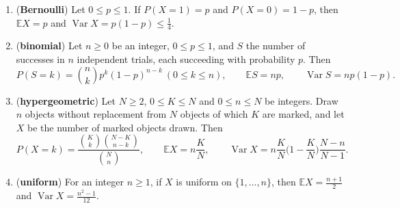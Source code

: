 \begin{proposition}\label{prop:laws}
\begin{enumerate}[label=(\alph*)]
\item (\textbf{Bernoulli}) Let $0\le p\le1$. If $P(X=1)=p$ and $P(X=0)=1-p$, then $\mathbb E X=p$ and $\operatorname{Var}X=p(1-p)\le\frac14$.
\item (\textbf{binomial}) Let $n\ge0$ be an integer, $0\le p\le1$, and $S$ the number of successes in $n$ independent trials, each succeeding with probability $p$. Then
\[
P(S=k)=\binom nkp^k(1-p)^{n-k}\ (0\le k\le n),\qquad\mathbb E S=np,\qquad\operatorname{Var}S=np(1-p).
\]
\item (\textbf{hypergeometric}) Let $N\ge2$, $0\le K\le N$ and $0\le n\le N$ be integers. Draw $n$ objects without replacement from $N$ objects of which $K$ are marked, and let $X$ be the number of marked objects drawn. Then
\[
P(X=k)=\frac{\binom Kk\binom{N-K}{n-k}}{\binom Nn},\qquad\mathbb E X=n\frac KN,\qquad\operatorname{Var}X=n\frac KN\Big(1-\frac KN\Big)\frac{N-n}{N-1}.
\]
\item (\textbf{uniform}) For an integer $n\ge1$, if $X$ is uniform on $\{1,\dots,n\}$, then $\mathbb EX=\frac{n+1}2$ and $\operatorname{Var}X=\frac{n^2-1}{12}$.
\end{enumerate}
\end{proposition}
